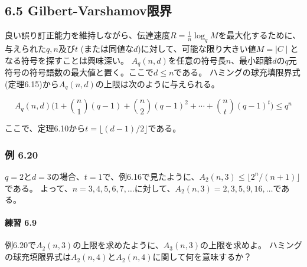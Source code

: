 \documentclass[12pt,a4paper]{article}
\begin{document}
  \subsection*{6.5 Gilbert-Varshamov限界}
    
    良い誤り訂正能力を維持しながら、伝達速度$R = \frac{1}{n} \log_q M$を最大化するために、与えられた$q, n$及び$t $ (または同値な$d$)に対して、可能な限り大きい値$M = \mid C \mid $となる符号を探すことは興味深い。
    $A_q (n, d)$を任意の符号長$n$、最小距離$d$の$q$元符号の符号語数の最大値と置く。ここで$d \leq n$である。
    ハミングの球充填限界式 (定理6.15)から$A_q (n, d)$の上限は次のように与えられる。

    \[A_q (n, d) \big(1 + \binom n1 (q - 1) + \binom n2 {(q - 1)}^2 + \cdots + \binom nt {(q - 1)}^t \big) \leq q^n\]

    ここで、定理6.10から$t = \lfloor (d - 1) / 2 \rfloor$である。

    \subsubsection*{例 6.20}
      
    $q = 2$と$d = 3$の場合、$t = 1$で、例6.16で見たように、$A_2 (n, 3) \leq \lfloor 2^n / (n + 1) \rfloor$である。
    よって、$n = 3, 4, 5, 6, 7, \dots $に対して、$A_2 (n, 3) = 2, 3, 5, 9, 16, \dots $である。

      \paragraph{練習 6.9}
        
      例6.20で$A_2 (n, 3)$の上限を求めたように、$A_3(n, 3)$の上限を求めよ。
      ハミングの球充填限界式は$A_2 (n, 4)$と$A_2 (n,4)$に関して何を意味するか？
\end{document}
